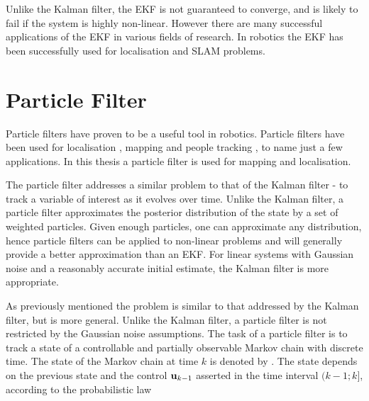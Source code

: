 
Unlike the Kalman filter, the EKF is not guaranteed to converge, and
is likely to fail if the system is highly non-linear. However there
are many successful applications of the EKF in various fields of
research. In robotics the EKF has been successfully used for
localisation \cite{Jensfelt99} and SLAM \cite{dissanayake01,
  bosse02atlas,guivant00:_auton_navig_map_using_laser} problems.


\section{Particle Filter}
\label{sec:PF}

Particle filters have proven to be a useful tool in robotics. Particle
filters have been used for localisation \cite{Thrun00j,thrun00}, mapping
\cite{fastslam} and people tracking
\cite{sidenbladh00stochastic}, to name just a few applications. 
In this thesis a particle filter is used for mapping and localisation.

The particle filter addresses a similar problem to that of the Kalman
filter - to track a variable of interest as it evolves over
time. Unlike the Kalman filter, a particle filter approximates the
posterior distribution of the state by a set of weighted
particles. Given enough particles, one can approximate any
distribution, hence particle filters can be applied to non-linear
problems and will generally provide a better approximation than an
EKF. For linear systems with Gaussian noise and a reasonably accurate
initial estimate, the Kalman filter is more appropriate.

As previously mentioned the problem is similar to that addressed by
the Kalman filter, but is more general. Unlike the Kalman filter, a
particle filter is not restricted by the Gaussian noise
assumptions. The task of a particle filter is to track a state of a
controllable and partially observable Markov chain with discrete
time. The state of the Markov chain at time $k$ is denoted by
. The state depends on the previous state
 and the control ${\bf u}_{k-1}$ asserted in the time interval
$(k-1;k]$, according to the probabilistic law

